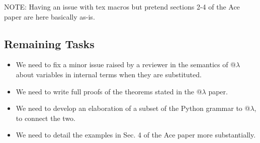 NOTE: Having an issue with tex macros but pretend sections 2-4 of the Ace paper are here basically as-is.

\subsection{Remaining Tasks}
\begin{itemize}
\item We need to fix a minor issue raised by a reviewer in the semantics of @$\lambda$ about variables in internal terms when they are substituted.
\item We need to write full proofs of the theorems stated in the @$\lambda$ paper.
\item We need to develop an elaboration of a subset of the Python grammar to @$\lambda$, to connect the two.
\item We need to detail the examples in Sec. 4 of the Ace paper more substantially.
\end{itemize}
